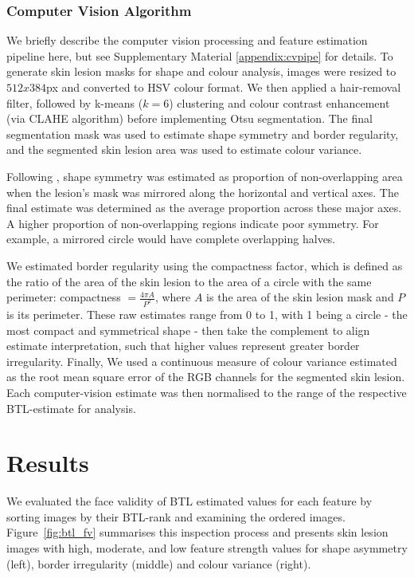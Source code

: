 \documentclass[
    man, 12pt, a4paper,
    donotrepeattitle, floatsintext, draftfirst
]{apa7}
\begin{document}
\subsubsection{Computer Vision Algorithm}
We briefly describe the computer vision processing and feature estimation pipeline here, but see Supplementary Material \ref{appendix:cvpipe} for details. To generate skin lesion masks for shape and colour analysis, images were resized to $512x384$px and converted to HSV colour format. We then applied a hair-removal filter, followed by k-means ($k=6$) clustering and colour contrast enhancement (via CLAHE algorithm) before implementing Otsu segmentation. The final segmentation mask was used to estimate shape symmetry and border regularity, and the segmented skin lesion area was used to estimate colour variance.

Following \parencite{majumder2019feature}, shape symmetry was estimated as proportion of non-overlapping area when the lesion's mask was mirrored along the horizontal and vertical axes.
The final estimate was determined as the average proportion across these major axes.
A higher proportion of non-overlapping regions indicate poor symmetry.
For example, a mirrored circle would have complete overlapping halves.

We estimated border regularity using the compactness factor, which is defined as the ratio of the area of the skin lesion to the area of a circle with the same perimeter: compactness $ = \frac{4\pi A}{P^2}$, where $A$ is the area of the skin lesion mask and $P$ is its perimeter.
These raw estimates range from 0 to 1, with 1 being a circle - the most compact and symmetrical shape - then take the complement to align estimate interpretation, such that higher values represent greater border irregularity.
Finally, We used a continuous measure of colour variance estimated as the root mean square error of the RGB channels for the segmented skin lesion.
Each computer-vision estimate was then normalised to the range of the respective BTL-estimate for analysis.

\section{Results}
We evaluated the face validity of BTL estimated values for each feature by sorting images by their BTL-rank and examining the ordered images. Figure~\ref{fig:btl_fv} summarises this inspection process and presents skin lesion images with high, moderate, and low feature strength values for shape asymmetry (left), border irregularity (middle) and colour variance (right).
\end{document}
